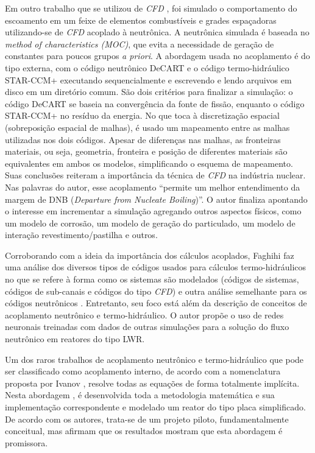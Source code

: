 Em outro trabalho que se utilizou de \textit{CFD} \cite{Yan2011}, foi simulado o comportamento do escoamento em um feixe de elementos 
combustíveis e grades espaçadoras utilizando-se de \textit{CFD} acoplado à neutrônica. A neutrônica 
simulada é baseada no \textit{method of characteristics (MOC)}, que evita a necessidade de geração 
de constantes para poucos grupos \textit{a priori}. A abordagem usada no 
acoplamento é do tipo externa, com o código neutrônico DeCART e o código termo-hidráulico 
STAR-CCM+ executando sequencialmente e escrevendo e lendo arquivos em disco em um 
diretório comum. São dois critérios para finalizar a simulação: o código DeCART se baseia 
na convergência da fonte de fissão, enquanto o código STAR-CCM+ no resíduo da energia. No que toca à 
discretização espacial (sobreposição espacial de malhas), é usado um mapeamento entre as malhas 
utilizadas nos dois códigos. Apesar de diferenças nas malhas, as fronteiras materiais, ou seja, geometria, 
fronteira e posição de diferentes materiais são equivalentes em ambos os modelos, simplificando
o esquema de mapeamento. Suas conclusões reiteram a importância da técnica de \textit{CFD} na indústria nuclear.
Nas palavras do autor, esse acoplamento 
``permite um melhor entendimento da margem de DNB (\textit{Departure from Nucleate Boiling})''.
O autor finaliza apontando o interesse em incrementar a simulação 
agregando outros aspectos físicos, como um modelo de corrosão, um modelo de geração do particulado, 
um modelo de interação revestimento/pastilha e outros. %

Corroborando com a ideia da importância dos cálculos acoplados, Faghihi faz uma análise
dos diversos tipos de códigos usados para cálculos termo-hidráulicos no que se refere à
forma como os sistemas são modelados (códigos de sistemas, códigos de sub-canais e códigos
do tipo \textit{CFD}) e outra análise semelhante para os códigos neutrônicos \cite{Faghihi2011}. Entretanto, seu
foco está além da descrição de conceitos de acoplamento
neutrônico e termo-hidráulico. O autor propõe o uso de redes neuronais treinadas com dados de
outras simulações para a solução do fluxo neutrônico em reatores do tipo LWR.

Um dos raros trabalhos de acoplamento neutrônico e termo-hidráulico que pode ser classificado
como acoplamento interno, de acordo com a nomenclatura proposta por Ivanov \cite{Ivanov2007},
resolve todas as equações de forma totalmente implícita. Nesta abordagem \cite{Pope2008}, é desenvolvida
toda a metodologia matemática e sua implementação correspondente e modelado um reator do tipo placa
simplificado. De acordo com os autores, trata-se de um projeto piloto, fundamentalmente
conceitual, mas afirmam que os resultados mostram que esta abordagem é promissora.

